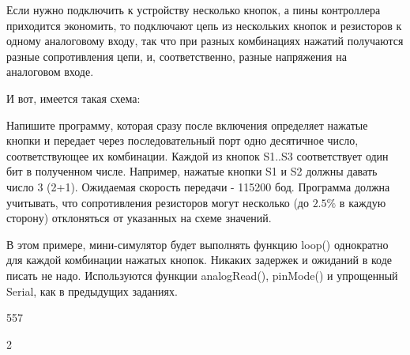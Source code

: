 
Если нужно подключить к устройству несколько кнопок, а пины контроллера приходится экономить, то подключают цепь из нескольких кнопок и резисторов к одному аналоговому входу, так что при разных комбинациях нажатий получаются разные сопротивления цепи, и, соответственно, разные напряжения на  аналоговом входе.  

И вот, имеется такая схема:


Напишите программу, которая сразу после включения определяет нажатые кнопки и передает через последовательный порт одно десятичное число, 
соответствующее их комбинации.  Каждой из кнопок S1..S3 соответствует один бит в полученном числе.  Например, нажатые кнопки S1 и S2 должны 
давать число 3  (2+1).     Ожидаемая скорость передачи - 115200 бод.  Программа должна учитывать,  что сопротивления резисторов могут 
несколько (до $2.5\%$ в каждую сторону) отклоняться от  указанных на схеме значений.

В этом примере, мини-симулятор будет выполнять функцию loop() однократно для каждой комбинации нажатых кнопок.  Никаких  задержек 
и ожиданий в коде писать не надо.  Используются функции analogRead(), pinMode() и упрощенный Serial, как в предыдущих заданиях.

\begin{myverbbox}[\small]{\vinput}
    557
\end{myverbbox}
\begin{myverbbox}[\small]{\voutput}
    2
\end{myverbbox}

